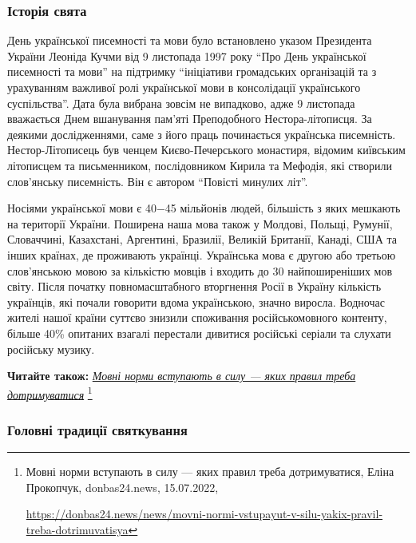 \subsubsection{Історія свята}

День української писемності та мови було встановлено указом Президента України
Леоніда Кучми від 9 листопада 1997 року \enquote{Про День української писемності та
мови} на підтримку \enquote{ініціативи громадських організацій та з урахуванням
важливої ролі української мови в консолідації українського суспільства}. Дата
була вибрана зовсім не випадково, адже 9 листопада вважається Днем вшанування
пам'яті Преподобного Нестора-літописця. За деякими дослідженнями, саме з його
праць починається українська писемність. Нестор-Літописець був ченцем
Києво-Печерського монастиря, відомим київським літописцем та письменником,
послідовником Кирила та Мефодія, які створили слов'янську писемність. Він є
автором \enquote{Повісті минулих літ}.


Носіями української мови є 40−45 мільйонів людей, більшість з яких мешкають на
території України. Поширена наша мова також у Молдові, Польщі, Румунії,
Словаччині, Казахстані, Аргентині, Бразилії, Великій Британії, Канаді, США та
інших країнах, де проживають українці. Українська мова є другою або третьою
слов'янською мовою за кількістю мовців і входить до 30 найпоширеніших мов
світу. Після початку повномасштабного вторгнення Росії в Україну кількість
українців, які почали говорити вдома українською, значно виросла. Водночас
жителі нашої країни суттєво знизили споживання російськомовного контенту,
більше 40\% опитаних взагалі перестали дивитися російські серіали та слухати
російську музику.

\textbf{Читайте також:} \href{https://donbas24.news/news/movni-normi-vstupayut-v-silu-yakix-pravil-treba-dotrimuvatisya}{\emph{Мовні норми вступають в силу — яких правил треба дотримуватися}}%
\footnote{Мовні норми вступають в силу — яких правил треба дотримуватися, Еліна Прокопчук, donbas24.news, 15.07.2022, \par%
\url{https://donbas24.news/news/movni-normi-vstupayut-v-silu-yakix-pravil-treba-dotrimuvatisya}%
}

\subsubsection{Головні традиції святкування}

